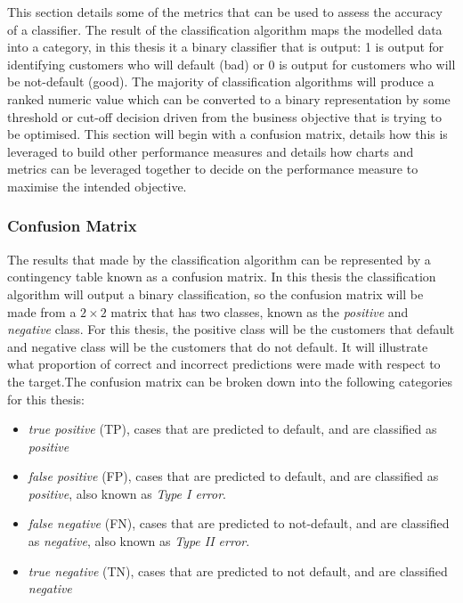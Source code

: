 This section details some of the metrics that can be used to assess the accuracy of a classifier. The result of the classification algorithm maps the modelled data into a category, in this thesis it a binary classifier that is output: 1 is output for identifying customers who will default (bad) or 0 is output for customers who will be not-default (good). The majority of classification algorithms will produce a ranked numeric value which can be converted to a binary representation by some threshold or cut-off decision driven from  the business objective that is trying to be optimised. This section will begin with a confusion matrix, details how this is leveraged to build other performance measures and details how charts and metrics can be leveraged together to decide on the performance measure to maximise the intended objective.

\subsubsection{Confusion Matrix}

The results that made by the classification algorithm can be represented by a contingency table known as a confusion matrix. In this thesis the classification algorithm will output a binary classification, so the confusion matrix will be made from a $2 \times 2$ matrix that has two classes, known as the \textit{positive} and \textit{negative} class. For this thesis, the positive class will be the customers that default and negative class will be the customers that do not default. It will illustrate what proportion of correct and incorrect predictions were made with respect to the target.The confusion matrix can be broken down into the following categories for this thesis:

\begin{itemize}
	\item \textit{true positive} (TP), cases that are predicted to default, and are {\color{green}{correctly}} classified as \textit{positive}
	\item \textit{false positive} (FP), cases that are predicted to default, and are {\color{red}{incorrectly}} classified as \textit{positive}, also known as \textit{Type I error}.
	\item \textit{false negative} (FN), cases that are predicted to not-default, and are {\color{red}{incorrectly}} classified as \textit{negative}, also known as \textit{Type II error}.
	\item  \textit{true negative} (TN), cases that are predicted to not default, and are {\color{green}{correctly}} classified \textit{negative}
	
\end{itemize}


